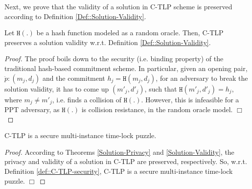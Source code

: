 Next, we prove that the validity of a solution in C-TLP scheme is preserved according to Definition \ref{Def::Solution-Validity}. 
  \begin{theorem} \label{Solution-Validity} Let $\mathtt{H}(.)$ be a hash function modeled as a random oracle. Then, C-TLP preserves a solution validity w.r.t. Definition \ref{Def::Solution-Validity}.  
\end{theorem}
\begin{proof}
 The proof  boils down to  the security (i.e. binding property) of the traditional hash-based commitment scheme. In particular, given an  opening pair, $\ddot{p}:(m_{\scriptscriptstyle j},d_{\scriptscriptstyle j})$ and the commitment $h_{\scriptscriptstyle j}=\mathtt{H}(m_{\scriptscriptstyle j},d_{\scriptscriptstyle j})$, for an adversary to break the solution validity, it has to come up $(m'_{\scriptscriptstyle j},d'_{\scriptscriptstyle j})$, such that $\mathtt{H}(m'_{\scriptscriptstyle j},d'_{\scriptscriptstyle j})=h_{\scriptscriptstyle j}$, where $m_{\scriptscriptstyle j}\neq m'_{\scriptscriptstyle j}$, i.e. finds a collision of $\mathtt{H}(.)$. However, this is infeasible for a PPT adversary, as $\mathtt{H}(.)$ is collision resistance, in the random oracle model. 
 \hfill\(\Box\)
\end{proof}
 



  \begin{theorem}  C-TLP  is a secure multi-instance time-lock puzzle.
\end{theorem}
   
 \begin{proof} According to Theorems \ref{Solution-Privacy} and \ref{Solution-Validity}, the privacy and validity of a solution in C-TLP are preserved, respectively.   So, w.r.t. Definition \ref{def::C-TLP-security}, C-TLP is a secure multi-instance  time-lock puzzle.
  \hfill\(\Box\)
\end{proof}
